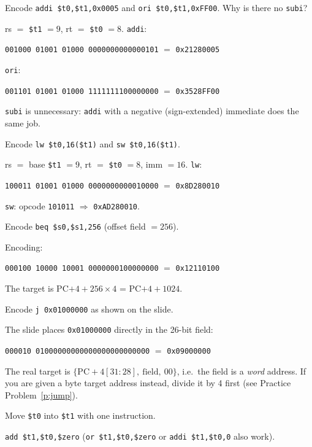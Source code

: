 \documentclass[11pt]{article}
\newcommand{\enc}[2]{\par{\centering\texttt{#1} $=$ \texttt{#2}\par}}
\begin{document}
\begin{exercise}
Encode \texttt{addi \$t0,\$t1,0x0005} and
\texttt{ori \$t0,\$t1,0xFF00}. Why is there no \texttt{subi}?
\end{exercise}
\begin{solution}
rs $=$ \texttt{\$t1} $=9$, rt $=$ \texttt{\$t0} $=8$.
\texttt{addi}: \enc{001000 01001 01000 0000000000000101}{0x21280005}
\texttt{ori}: \enc{001101 01001 01000 1111111100000000}{0x3528FF00}
\texttt{subi} is unnecessary: \texttt{addi} with a negative (sign-extended)
immediate does the same job.
\end{solution}

\begin{exercise}
Encode \texttt{lw \$t0,16(\$t1)} and \texttt{sw \$t0,16(\$t1)}.
\end{exercise}
\begin{solution}
rs $=$ base \texttt{\$t1} $=9$, rt $=$ \texttt{\$t0} $=8$, imm $=16$.
\texttt{lw}: \enc{100011 01001 01000 0000000000010000}{0x8D280010}
\texttt{sw}: opcode \texttt{101011} $\Rightarrow$ \texttt{0xAD280010}.
\end{solution}

\begin{exercise}[Branch]
Encode \texttt{beq \$s0,\$s1,256} (offset field $=256$).
\end{exercise}
\begin{solution}
Encoding:
\enc{000100 10000 10001 0000000100000000}{0x12110100}
The target is PC$+4+256\times4$ = PC$+4+1024$.
\end{solution}

\begin{exercise}[Jump]
Encode \texttt{j 0x01000000} as shown on the slide.
\end{exercise}
\begin{solution}
The slide places \texttt{0x01000000} directly in the 26-bit field:
\enc{000010 01000000000000000000000000}{0x09000000}
The real target is $\{\text{PC}{+}4[31{:}28],\ \text{field},\ 00\}$, i.e.\
the field is a \emph{word} address. If you are given a byte target address
instead, divide it by 4 first (see Practice Problem~\ref{p:jump}).
\end{solution}

\begin{exercise}
Move \texttt{\$t0} into \texttt{\$t1} with one instruction.
\end{exercise}
\begin{solution}
\texttt{add \$t1,\$t0,\$zero} (\texttt{or \$t1,\$t0,\$zero} or
\texttt{addi \$t1,\$t0,0} also work).
\end{solution}
\end{document}
